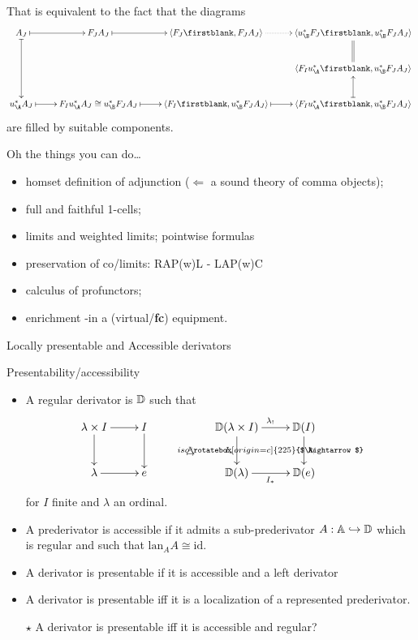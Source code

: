\documentclass{beamer}
\newcommand{\Swarrow}{\rotatebox[origin=c]{225}{$\Rightarrow$}}
\def\lan{\text{lan}}
\begin{document}
%
%
%
\begin{frame}
That is equivalent to the fact that the diagrams
\[
\xymatrix{
A_J\ar@{|->}[dd]\ar@{|->}[r] & F_J A_J \ar@{|->}[r]& \langle F_J\firstblank,F_JA_J\rangle \ar@{.>}[r] & \langle u^*_{\B}F_J\firstblank,u^*_{\B}F_JA_J \rangle\ar@{=}[d]\\
&&& \langle F_I u^*_{\A}\firstblank,u^*_{\B}F_JA_J \rangle\\
u^*_{\A}A_J \ar@{|->}[r]& F_Iu^*_{\A}A_J \cong u^*_{\B}F_JA_J \ar@{|->}[r]& \langle F_I\firstblank, u^*_{\B}F_JA_J\rangle \ar@{|->}[r]& \langle F_Iu^*_\A \firstblank, u^*_{\B}F_JA_J\ar@{|->}[u] \rangle
}
\]
are filled by suitable components.
\end{frame}
%
%
%
%
\begin{frame}{Oh the things you can do\dots}
\begin{itemize}
\item homset definition of adjunction ($\Leftarrow$ a sound theory of comma objects);
\item full and faithful 1-cells;
\item limits and weighted limits; pointwise formulas%
\item preservation of co/limits: RAP(w)L - LAP(w)C
\item calculus of profunctors;
\item enrichment -in a (virtual/{\bf fc}) equipment.

\end{itemize}
\end{frame}
%
%
%
%
\begin{frame}
\huge
\centering
Locally presentable and Accessible derivators
\end{frame}
\begin{frame}{Presentability/accessibility}
\begin{itemize}
\item A \alert{regular} derivator is $\mathbb{D}$ such that
\[
\xymatrix{
\lambda\times I \ar[r]\ar[d]& I \ar@{}[drr]|{\overset{\D}\mapsto} \ar[d] && \D(\lambda\times I) \ar[r]^{\lambda_!}\ar[d]_{I_*}& \D(I) \ar[d]^{\lambda_!}\ar@{}[dl]|{iso\Swarrow}\\
\lambda \ar[r]  & e && \D(\lambda) \ar[r]_{I_*} & \D(e)} 
\]
for $I$ finite and $\lambda$ an ordinal.
\item A prederivator is \alert{accessible} if it admits a sub-prederivator $A : \mathbb{A} \hookrightarrow \mathbb{D}$ which is regular and such that $\lan_AA\cong \text{id}$.
\item A derivator is \alert{presentable} if it is accessible and a left derivator
\item A derivator is presentable iff it is a localization of a represented prederivator.
\item[$\star$] A derivator is presentable iff it is accessible and regular?
\end{itemize}
\end{frame}
\end{document}
